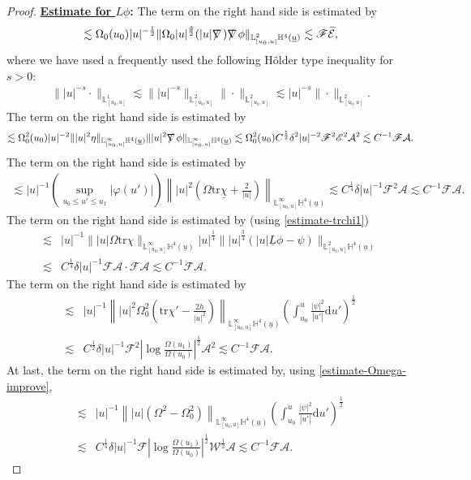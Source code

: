\documentclass[11pt,reqno]{amsart}
\theoremstyle{definition}
\numberwithin{equation}{section}
\newcommand{\D}{\mathrm{d}}
\newcommand{\tr}{\mathrm{tr}}
\renewcommand{\L}{\mathbb{L}}
\renewcommand{\H}{\mathbb{H}}
\def\chib{\underline{\chi}}
\def\Lb{\underline{L}}
\def\tr{\mathrm{tr}}
\def\ub{\underline{u}}
\def\nablas{\mbox{$\nabla \mkern -13mu /$ }}
\begin{document}
\begin{proof}  {\bf \underline{Estimate for $L\phi$}:}
 The  term on the right hand side is estimated by
\begin{align*}\lesssim \Omega_0(u_0)|u|^{-\frac{1}{2}}\|\Omega_0|u|^{\frac{3}{2}}(|u|\nablas)\nablas\phi\|_{\L^2_{[u_0,u]}\H^4(\ub)}\lesssim\mathscr{F}\widetilde{\mathcal{E}},\end{align*}
where we have used a frequently used the following H\"older type inequality for $s>0$:
\begin{align}\label{Holder-u}
\||u|^{-s}\cdot\|_{\L^1_{[u_0,u]}}\lesssim\||u|^{-s}\|_{\L^2_{[u_0,u]}}\|\cdot\|_{\L^2_{[u_0,u]}}\lesssim|u|^{-s}\|\cdot\|_{\L^2_{[u_0,u]}}.
\end{align}
 The  term on the right hand side is estimated by
\begin{align*}\lesssim\Omega_0^2(u_0)|u|^{-2}\||u|^2\eta\|_{\L^\infty_{[u_0,u]}\H^4(\ub)}\||u|^2\nablas\phi\|_{\L^\infty_{[u_0,u]}\H^4(\ub)}
\lesssim\Omega_0^2(u_0)C^{\frac{1}{2}}\delta^2|u|^{-2}\mathscr{F}^2\mathscr{E}^2\mathcal{A}^2\lesssim C^{-1}\mathscr{F}\mathcal{A}.\end{align*}
 The  term on the right hand side is estimated by
\begin{align*}\lesssim|u|^{-1}\left(\sup_{u_0\le u'\le u_1}|\varphi(u')|\right)\left\||u|^2\left(\Omega\tr\chib+\frac{2}{|u|}\right)\right\|_{\L^\infty_{[u_0,u]}\H^4(\ub)}
\lesssim C^{\frac{1}{4}}\delta|u|^{-1}\mathscr{F}^2\mathcal{A}\lesssim C^{-1}\mathscr{F}\mathcal{A}.\end{align*}
 The  term on the right hand side is estimated by (using \eqref{estimate-trchi1})
\begin{align*}\lesssim&|u|^{-1}\||u|\Omega\tr\chi\|_{\L^\infty_{[u_0,u]}\H^4(\ub)}|u|^{\frac{1}{4}}\||u|^{\frac{3}{4}}(|u|\Lb\phi-\psi)\|_{\L^2_{[u_0,u]}\H^4(\ub)}\\
\lesssim&C^{\frac{1}{4}}\delta|u|^{-1}\mathscr{F}\mathcal{A}\cdot\mathscr{F}\mathcal{A}\lesssim C^{-1}\mathscr{F}\mathcal{A}.\end{align*}
The  term on the right hand side is estimated by
\begin{align*}\lesssim&|u|^{-1}\left\||u|^2\Omega_0^2\left(\tr\chi'-\frac{2h}{|u|^2}\right)\right\|_{\L^\infty_{[u_0,u]}\H^4(\ub)}\left(\int_{u_0}^u\frac{|\psi|^2}{|u'|}\D u'\right)^{\frac{1}{2}}\\
\lesssim&C^{\frac{1}{2}}\delta|u|^{-1}\mathscr{F}^2\left|\log\frac{\Omega(u_1)}{\Omega(u_0)}\right|^{\frac{1}{2}}\mathcal{A}^2\lesssim C^{-1}\mathscr{F}\mathcal{A}.\end{align*}
At last, the  term on the right hand side is estimated by, using \eqref{estimate-Omega-improve},
\begin{align*}\lesssim&|u|^{-1}\left\||u|(\Omega^2-\Omega_0^2)\right\|_{\L^\infty_{[u_0,u]}\H^4(\ub)}\left(\int_{u_0}^u\frac{|\psi|^2}{|u'|}\D u'\right)^{\frac{1}{2}}\\
\lesssim&C^{\frac{1}{4}}\delta|u|^{-1}\mathscr{F}\left|\log\frac{\Omega(u_1)}{\Omega(u_0)}\right|^{\frac{1}{2}}\mathscr{W}^{\frac{1}{2}}\mathcal{A}\lesssim C^{-1}\mathscr{F}\mathcal{A}.\end{align*}


\end{proof}
\end{document}
